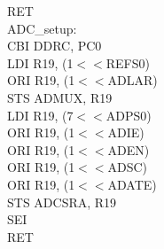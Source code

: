 \documentclass[titlepage, a4paper, 10pt, reqno, openany]{report}
\begin{document}
\begin{minipage}[t]{.45\linewidth}
	\hspace*{.5cm}	RET \\
	\newline
	ADC\_setup: \\
	\hspace*{.5cm}	CBI DDRC, PC0 \\
	\hspace*{.5cm}	LDI R19, (1$<<$REFS0) \\
	\hspace*{.5cm}	ORI R19, (1$<<$ADLAR) \\
	\hspace*{.5cm}	STS ADMUX, R19 \\
	\hspace*{.5cm}	LDI R19, (7$<<$ADPS0) \\
	\hspace*{.5cm}	ORI R19, (1$<<$ADIE) \\
	\hspace*{.5cm}	ORI R19, (1$<<$ADEN) \\
	\hspace*{.5cm}	ORI R19, (1$<<$ADSC) \\
	\hspace*{.5cm}	ORI R19, (1$<<$ADATE) \\
	\hspace*{.5cm}	STS ADCSRA, R19 \\
	\hspace*{.5cm}	SEI \\
	\hspace*{.5cm}	RET
\end{minipage}
\vline \quad
\end{document}
